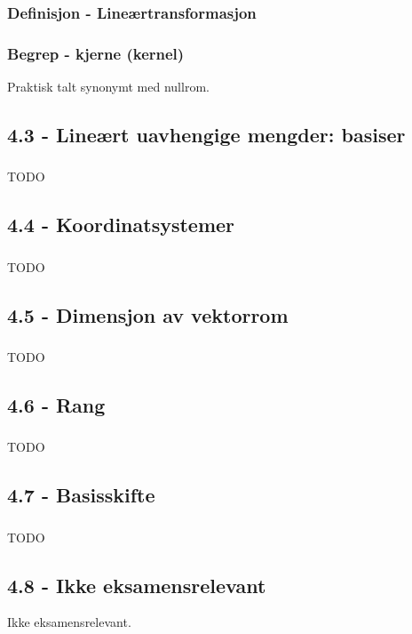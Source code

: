 \documentclass{article}
\begin{document}
      \subsubsection{Definisjon - Lineærtransformasjon}
        
      \subsubsection{Begrep - kjerne (kernel)}
        Praktisk talt synonymt med nullrom.
    \subsection{4.3 - Lineært uavhengige mengder: basiser}
      \subsubsection{}
        TODO
    \subsection{4.4 - Koordinatsystemer}
      \subsubsection{}
        TODO
    \subsection{4.5 - Dimensjon av vektorrom}
      \subsubsection{}
        TODO
    \subsection{4.6 - Rang}
      \subsubsection{}
        TODO
    \subsection{4.7 - Basisskifte}
      \subsubsection{}
        TODO
    \subsection{4.8 - Ikke eksamensrelevant}
      Ikke eksamensrelevant.
\end{document}

